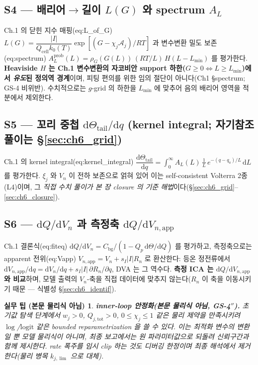 \documentclass[11pt,a4paper]{article}
\newtheorem*{practicebox}{실무 팁 (본문 물리식 아님)}
\newcommand{\dd}{\mathrm{d}}
\newcommand{\app}{\mathrm{app}}
\newcommand{\bg}{\mathrm{bg}}
\newcommand{\cell}{\mathrm{cell}}
\newcommand{\tot}{\mathrm{tot}}
\begin{document}
\subsection{S4 — 배리어$\to$길이 $L(G)$ 와 spectrum $A_L$}\label{sec:ch6_S4}
Ch.1 의 닫힌 지수 매핑(eq:L\_of\_G) $L(G)=\dfrac{|I|}{Q_\cell k_0(T)}\exp[(G-\chi_j\mathcal A_j)/RT]$ 과 변수변환
밀도 보존(eq:spectrum) $A_L^{\mathrm{prob}}(L)=\rho_G(G(L))\,(RT/L)\,H(L-L_{\min})$ 를 평가한다. \textbf{Heaviside
$H$ 는 Ch.1 변수변환의 자코비안 support 하한($G\ge0\Leftrightarrow L\ge L_{\min}$)에서 \emph{유도}된 정의역
경계}이며, 피팅 편의를 위한 임의 절단이 아니다(Ch1 \S spectrum; GS-4 비위반). 수치적으로는 $g$-grid 의 하한을
$L_{\min}$ 에 맞추어 음의 배리어 영역을 적분에서 제외한다.

\subsection{S5 — 꼬리 중첩 $\dd\Theta_\mathrm{tail}/\dd q$ (kernel integral; 자기참조 풀이는 \S\ref{sec:ch6_grid})}\label{sec:ch6_S5}
Ch.1 의 kernel integral(eq:kernel\_integral) $\dfrac{\dd\Theta_\mathrm{tail}}{\dd q}=\int_0^\infty A_L(L)\,\tfrac1L\,
e^{-(q-q_a)/L}\,\dd L$ 를 평가한다. $\xi_j$ 와 $V_n$ 이 전하 보존으로 얽혀 있어 이는 self-consistent Volterra
2종(L4)이며, 그 \emph{직접 수치 풀이가 본 장 closure 의 기준 해법}이다(\S\ref{sec:ch6_grid}--\ref{sec:ch6_closure}).

\subsection{S6 — $\dd Q/\dd V_n$ 과 측정축 $\dd Q/\dd V_{n,\app}$}\label{sec:ch6_S6}
Ch.1 결론식(eq:fiteq) $\dd Q/\dd V_n=C_\bg/(1-Q_p\,\dd\Theta/\dd Q)$ 를 평가하고, 측정축으로는 apparent
전위(eq:Vapp) $V_{n,\app}=V_n+s_I|I|R_n$ 로 환산한다: 등온 정전류에서 $\dd V_{n,\app}/\dd q=\dd V_n/\dd q+
s_I|I|\,\partial R_n/\partial q$, DVA 는 그 역수다. \textbf{측정 ICA 는 $\dd Q/\dd V_{n,\app}$ 와 비교}하며, 모델
출력의 $V_n$-축을 직접 데이터에 맞추지 않는다($R_n$ 이 축을 이동시키기 때문 — 식별성 \S\ref{sec:ch6_identif}).

\begin{practicebox}
\textbf{inner-loop 안정화(본문 물리식 아님, GS-4$''$).} 초기값 탐색 단계에서 $w_j>0$, $Q_{j,\tot}>0$,
$0\le\chi_j\le1$ 같은 물리 제약을 만족시키려 $\log$/$\mathrm{logit}$ 같은 bounded reparametrization 을 쓸 수
있다. 이는 \emph{최적화 변수의 변환일 뿐} 모델 물리식이 아니며, 최종 보고에서는 원 파라미터값으로 되돌려
신뢰구간과 함께 제시한다. rate 폭주를 임시 clip 하는 것도 디버깅 한정이며 최종 해석에서 제거한다(물리 병목
$k_{j,\lim}$ 으로 대체).
\end{practicebox}
\end{document}
